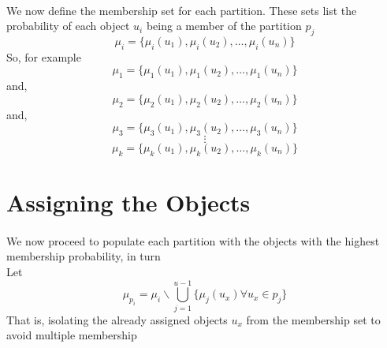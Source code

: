 \documentclass[a4paper,openany]{book}
\begin{document}
			\paragraph{}
				We now define the membership set for each partition. These sets list the probability of each object $u_i$ being a member of the partition $p_j$
				\begin{equation}
					\mu_i = \{ \mu_i(u_1), \mu_i(u_2),\dots,\mu_i(u_n) \}
				\end{equation}
				So, for example
				\begin{equation}
					\mu_1 = \{ \mu_1(u_1), \mu_1(u_2),\dots,\mu_1(u_n) \}
				\end{equation}
				and,
				\begin{equation}
					\mu_2 = \{ \mu_2(u_1), \mu_2(u_2),\dots,\mu_2(u_n) \}
				\end{equation}
				and,
				\begin{equation}
					\mu_3 = \{ \mu_3(u_1), \mu_3(u_2),\dots,\mu_3(u_n) \}
				\end{equation}
				\[
					\vdots
				\]
				\begin{equation}
					\mu_k = \{ \mu_k(u_1), \mu_k(u_2),\dots,\mu_k(u_n) \}
				\end{equation}
		\section{Assigning the Objects}
			\paragraph{}
				We now proceed to populate each partition with the objects with the highest membership probability, in turn \\
				Let
				\begin{equation}
					\mu_{p_i} = \mu_i \backslash \bigcup_{j=1}^{u-1}{ \{ \mu_j(u_x) \forall u_x \in p_j \} }
				\end{equation}
				That is, isolating the already assigned objects $u_x$ from the membership set to avoid multiple membership
\end{document}

